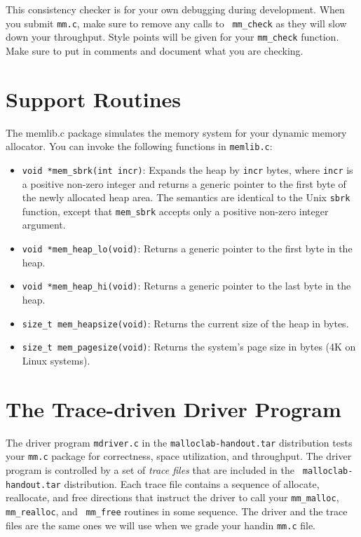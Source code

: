 \documentclass[11pt]{article}
\begin{document}
This consistency checker is for your own debugging during development.
When you submit {\tt mm.c}, make sure to remove any calls to {\tt
mm\_check} as they will slow down your throughput.  Style points will
be given for your {\tt mm\_check} function. Make sure to put in
comments and document what you are checking.


\section{Support Routines}
The {memlib.c} package simulates the memory system for your
dynamic memory allocator. You can invoke the following functions
in {\tt memlib.c}:

\begin{itemize}
\item {\tt void *mem\_sbrk(int incr)}:   
Expands the heap by {\tt incr} bytes, where {\tt incr} is a positive
non-zero integer and returns a generic pointer to the first byte of
the newly allocated heap area. The semantics are identical to the Unix
{\tt sbrk} function, except that {\tt mem\_sbrk} accepts only a
positive non-zero integer argument.

\item {\tt void *mem\_heap\_lo(void)}:
Returns a generic pointer to the first byte in the heap.

\item {\tt void *mem\_heap\_hi(void)}:
Returns a generic pointer to the last byte in the heap.

\item {\tt size\_t mem\_heapsize(void)}:
Returns the current size of the heap in bytes.

\item {\tt size\_t mem\_pagesize(void)}:
Returns the system's page size in bytes (4K on Linux systems).

\end{itemize}

\section{The Trace-driven Driver Program}

The driver program {\tt mdriver.c} in the {\tt malloclab-handout.tar}
distribution tests your {\tt mm.c} package for correctness, space
utilization, and throughput. The driver program is controlled by a set
of {\em trace files} that are included in the {\tt
malloclab-handout.tar} distribution. Each trace file contains a
sequence of allocate, reallocate, and free directions that instruct
the driver to call your {\tt mm\_malloc}, {\tt mm\_realloc}, and {\tt
mm\_free} routines in some sequence. The driver and the trace files
are the same ones we will use when we grade your handin {\tt mm.c}
file.
\end{document}
